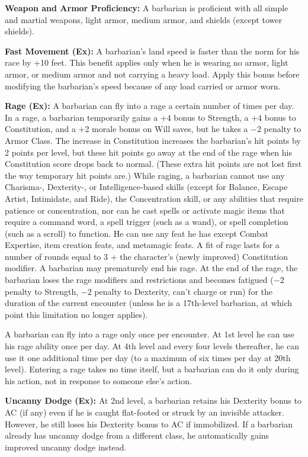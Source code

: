 \textbf{Weapon and Armor Proficiency:} A barbarian is proficient with all simple and martial weapons, light armor, medium armor, and shields (except tower shields).

\textbf{Fast Movement (Ex):} A barbarian's land speed is faster than the norm for his race by +10 feet. This benefit applies only when he is wearing no armor, light armor, or medium armor and not carrying a heavy load. Apply this bonus before modifying the barbarian's speed because of any load carried or armor worn.

\textbf{Rage (Ex):} A barbarian can fly into a rage a certain number of times per day. In a rage, a barbarian temporarily gains a +4 bonus to Strength, a +4 bonus to Constitution, and a +2 morale bonus on Will saves, but he takes a $-2$ penalty to Armor Class. The increase in Constitution increases the barbarian's hit points by 2 points per level, but these hit points go away at the end of the rage when his Constitution  score drops back to normal. (These extra hit points are not lost first the way temporary hit points are.) While raging, a barbarian cannot use any Charisma-, Dexterity-, or Intelligence-based skills (except for Balance, Escape Artist, Intimidate, and Ride), the Concentration skill, or any abilities that require patience or concentration, nor can he cast spells or activate magic items that require a command word, a spell trigger (such as a wand), or spell completion (such as a scroll) to function. He can use any feat he has except Combat Expertise, item creation feats, and metamagic feats. A fit of rage lasts for a number of rounds equal to 3 + the character's (newly improved) Constitution modifier. A barbarian may prematurely end his rage. At the end of the rage, the barbarian loses the rage modifiers and restrictions and becomes fatigued ($-2$ penalty to Strength, $-2$ penalty to Dexterity, can't charge or run) for the duration of the current encounter (unless he is a 17th-level barbarian, at which point this limitation no longer applies).

A barbarian can fly into a rage only once per encounter. At 1st level he can use his rage ability once per day. At 4th level and every four levels thereafter, he can use it one additional time per day (to a maximum of six times per day at 20th level). Entering a rage takes no time itself, but a barbarian can do it only during his action, not in response to someone else's action. 

\textbf{Uncanny Dodge (Ex):} At 2nd level, a barbarian retains his Dexterity bonus to AC (if any) even if he is caught flat-footed or struck by an invisible attacker. However, he still loses his Dexterity bonus to AC if immobilized. If a barbarian already has uncanny dodge from a different class, he automatically gains improved uncanny dodge instead.

